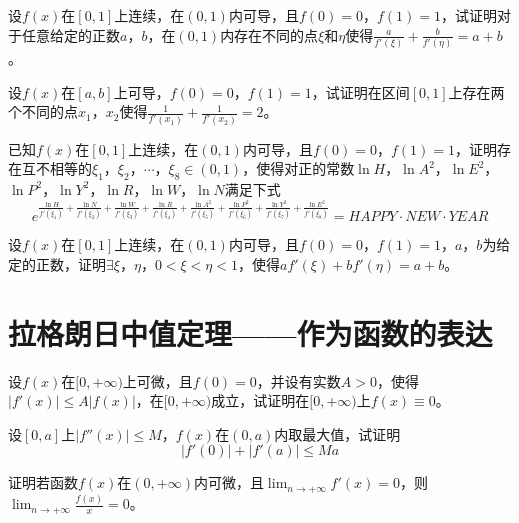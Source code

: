\begin{example}
	\color{red}设$f(x)$在$[0,1]$上连续，在$(0,1)$内可导，且$f(0)=0$，$f(1)=1$，试证明对于任意给定的正数$a$，$b$，在$(0,1)$内存在不同的点$\xi$和$\eta$使得$\frac{a}{f'(\xi)}+\frac{b}{f'(\eta)}=a+b$\color{black}。
\end{example}

\begin{example}
	设$f(x)$在$[a,b]$上可导，$f(0)=0$，$f(1)=1$，试证明在区间$[0,1]$上存在两个不同的点$x_1$，$x_2$使得$\frac{1}{f'(x_1)}+\frac{1}{f'(x_2)}=2$。
\end{example}

\begin{example}
	已知$f(x)$在$[0,1]$上连续，在$(0,1)$内可导，且$f(0)=0$，$f(1)=1$，证明存在互不相等的$\xi_1$，$\xi_2$，$\cdots$，$\xi_8\in(0,1)$，使得对正的常数$\ln H$，$\ln A^2$，$\ln E^2$，$\ln P^2$，$\ln Y^2$，$\ln R$，$\ln W$，$\ln N$满足下式\[e^{\frac{\ln H}{f'(\xi_1)}+\frac{\ln N}{f'(\xi_2)}+\frac{\ln W}{f'(\xi_3)}+\frac{\ln R}{f'(\xi_4)}+\frac{\ln A^2}{f'(\xi_5)}+\frac{\ln P^2}{f'(\xi_6)}+\frac{\ln Y^2}{f'(\xi_7)}+\frac{\ln E^2}{f'(\xi_8)}}=HAPPY\cdot NEW\cdot YEAR\]
\end{example}

\begin{example}
	设$f(x)$在$[0,1]$上连续，在$(0,1)$内可导，且$f(0)=0$，$f(1)=1$，$a$，$b$为给定的正数，证明$\exists\xi$，$\eta$，$0<\xi<\eta<1$，使得$af'(\xi)+bf'(\eta)=a+b$。
\end{example}

\section{拉格朗日中值定理——作为函数的表达}

\begin{example}
	设$f(x)$在$[0,+\infty)$上可微，且$f(0)=0$，并设有实数$A>0$，使得$|f'(x)|\leqslant A|f(x)|$，在$[0,+\infty)$成立，试证明在$[0,+\infty)$上$f(x)\equiv 0$。
\end{example}

\begin{example}
	设$[0,a]$上$|f''(x)|\leqslant M$，$f(x)$在$(0,a)$内取最大值，试证明\[|f'(0)|+|f'(a)|\leqslant Ma\]
\end{example}

\begin{example}
	证明若函数$f(x)$在$(0,+\infty)$内可微，且$\lim_{n\to+\infty}f'(x)=0$，则$\lim_{n\to+\infty}\frac{f(x)}{x}=0$。
\end{example}

